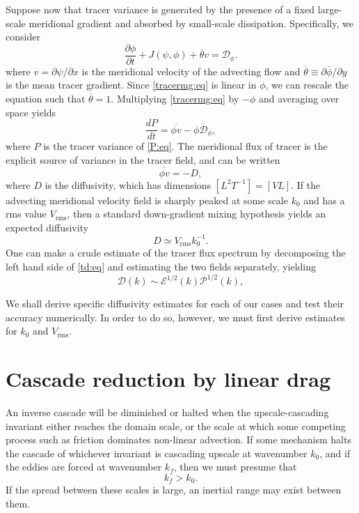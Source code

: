 \documentclass{jfm}
\newcommand{\eg}  {\textit{e.g., }}
\newcommand{\ca}  [1]{\mathcal{#1}}
\newcommand{\rms} {\mathrm{rms}}
\newcommand{\p}   {\partial}
\newcommand{\pp}  [2]{\frac{\p #1}{\p #2}}
\newcommand{\dd}  [2]{\frac{d #1}{d #2}}
\begin{document}
Suppose now that tracer variance is generated by the presence of a
fixed large-scale meridional gradient and absorbed by small-scale
dissipation. Specifically, we consider
\begin{equation}
\pp{\phi}{t} + J(\psi,\phi) + \overline{\theta} v = \ca{D}_{\phi}.
\label{tracermg:eq}
\end{equation}
where $v=\p\psi/\p x$ is the meridional velocity of the advecting
flow and $\overline{\theta} \equiv \p\bar{\phi}/\p y$ is the mean
tracer gradient.  Since \eqref{tracermg:eq} is linear in $\phi$,
we can rescale the equation such that $\overline{\theta}=1$.
Multiplying \eqref{tracermg:eq} by $-\phi$ and averaging over
space yields
\begin{equation}
\dd{P}{t} = \overline{\phi v} - \overline{\phi \ca{D}_{\phi}},
\label{Pbal:eq}
\end{equation}
where $P$ is the tracer variance of \eqref{P:eq}.  The meridional flux
of tracer is the explicit source of variance in the tracer field, and
can be written
\begin{equation}
\overline{\phi v} = -D,
\label{td:eq}
\end{equation}
where $D$ is the diffusivity, which has dimensions $[L^2T^{-1}] =
[VL]$.  If the advecting meridional velocity field is sharply peaked
at some scale $k_0$ and has a rms value $V_{\rms}$, then a standard
down-gradient mixing hypothesis \citep[\eg][chapter 8]{Tennekes94}
yields an expected diffusivity
\begin{equation}
D \simeq V_{\rms}k_0^{-1}.
\label{diff:eq}
\end{equation}
One can make a crude estimate of the tracer flux spectrum by
decomposing the left hand side of \eqref{td:eq} and estimating the two
fields separately, yielding
\begin{equation}
\ca{D}(k) \sim \ca{E}^{1/2}(k)\ca{P}^{1/2}(k),
\label{Dspec:eq}
\end{equation}

We shall derive specific diffusivity estimates for each of our
cases and test their accuracy numerically.  In order to do
so, however, we must first derive estimates for $k_0$ and
$V_{\rms}$.

\section{Cascade reduction by linear drag}
\label{halting:sec}

An inverse cascade will be diminished or halted when the
upscale-cas\-ca\-ding in\-va\-ri\-ant either reaches the domain scale,
or the scale at which some competing process such as friction
dominates non-linear advection.  If some mechanism halts the cascade
of whichever invariant is cascading upscale at wavenumber $k_0$, and
if the eddies are forced at wavenumber $k_f$, then we must presume
that
\begin{equation}
k_f>k_0.
\label{kfkl:eq}
\end{equation}
If the spread between these scales is large, an inertial range may
exist between them.
\end{document}
